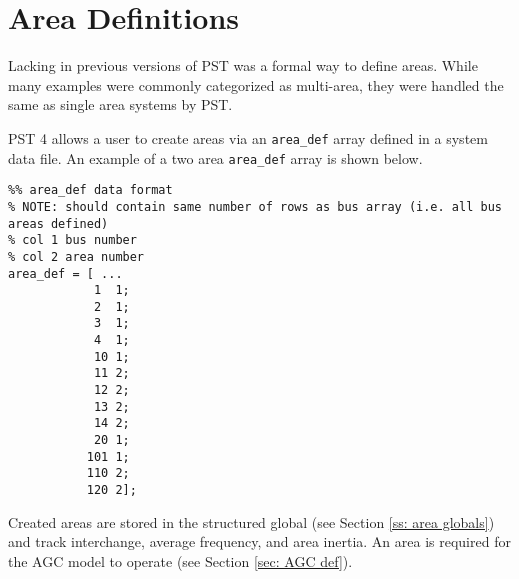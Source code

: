 \section{Area Definitions}  
Lacking in previous versions of PST was a formal way to define areas.
While many examples were commonly categorized as multi-area, they were handled the same as single area systems by PST.

PST 4 allows a user to create areas via an \verb|area_def| array defined in a system data file.
An example of a two area \verb|area_def| array is shown below.

\begin{verbatim}
%% area_def data format
% NOTE: should contain same number of rows as bus array (i.e. all bus areas defined)
% col 1 bus number
% col 2 area number
area_def = [ ...
            1  1;
            2  1;
            3  1;
            4  1;
            10 1;
            11 2;
            12 2;
            13 2;
            14 2; 
            20 1;
           101 1; 
           110 2;
           120 2];
\end{verbatim}

Created areas are stored in the structured global (see Section \ref{ss: area globals}) and track interchange, average frequency, and area inertia.
An area is required for the AGC model to operate (see Section \ref{sec: AGC def}).

